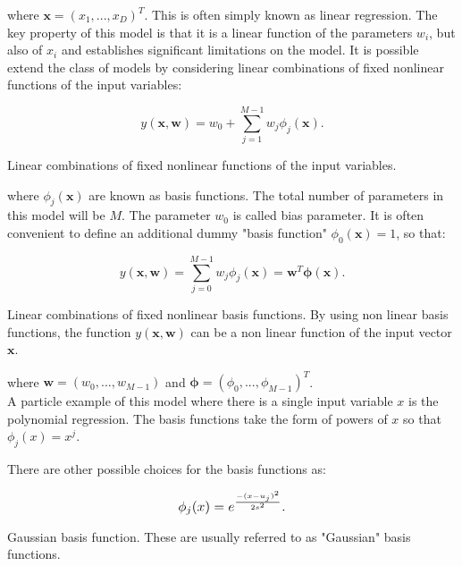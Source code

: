 \noindent where $\bm{x}=(x_1,...,x_D)^T$. This is often simply known as linear regression. The key property of this model is that it is a linear function of the parameters $w_i$, but also of $x_i$ and establishes significant limitations on the model. It is possible extend the class of models by considering linear combinations of fixed nonlinear functions of the input variables:
\begin{Equation}[H]
	\centering
	\begin{equation} \label{eq:lincombbasis}
		y(\bm{x}, \bm{w})=w_0 + \sum_{j=1}^{M-1}w_j \phi_j( \bm{x}) .
	\end{equation}
	\caption[Linear combinations of fixed nonlinear functions of the input variables.]{Linear combinations of fixed nonlinear functions of the input variables.}
\end{Equation}

\noindent where $\phi_j( \bm{x} )$ are known as basis functions. The total number of parameters in this model will be $M$. The parameter $w_0$ is called bias parameter. It is often convenient to define an additional dummy "basis function" $\phi_0( \bm{x} )=1$, so that:

\begin{Equation}[H]
	\centering
	\begin{equation} \label{eq:vectlincomb}
		y(\bm{x}, \bm{w})=\sum_{j=0}^{M-1}w_j \phi_j( \bm{x} ) = \bm{w}^T \bm{\phi(x)} .
	\end{equation}
	\caption[Linear combinations of fixed nonlinear basis functions.]{Linear combinations of fixed nonlinear basis functions. By using non linear basis functions, the function $y(\bm{x}, \bm{w})$ can be a non linear function of the input vector $\bm{x}$.}
\end{Equation}

\noindent where $\bm{w}=(w_0,...,w_{M-1})$ and $\bm{\phi}=(\phi_0,...,\phi_{M-1})^T$. \\

\noindent A particle example of this model where there is a single input variable $x$ is the polynomial regression. The basis functions take the form of powers of $x$ so that $\phi_j(x)=x^j$.

\noindent There are other possible choices for the basis functions as:

\begin{Equation}[H]
	\centering
	\begin{equation} \label{eq:gausbasfun}
		\resizebox{.25\hsize}{!}{$ \phi_j(x)=e^{\frac{-(x-u_j)^2}{2s^2}} .$}
	\end{equation}
	\caption[Gaussian basis function.]{Gaussian basis function. These are usually referred to as "Gaussian" basis functions.}
\end{Equation}


